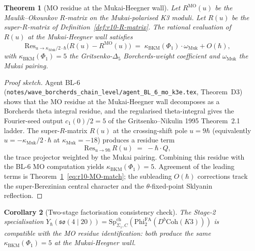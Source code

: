 \documentclass{article}
\providecommand{\fso}{\mathfrak{so}}
\providecommand{\kBKM}{\kappa_{\mathrm{BKM}}}
\providecommand{\PhiFA}{\mathrm{Phi}^{\mathrm{FA}}}
\providecommand{\SpCh}{\mathrm{Sp}^{\mathrm{ch}}}
\newtheorem{theorem}{Theorem}
\newtheorem{corollary}[theorem]{Corollary}
\theoremstyle{definition}
\begin{document}
\begin{theorem}[MO residue at the Mukai-Heegner wall]
\label{thm:r10-MO-match}
Let $R^{\mathrm{MO}}(u)$ be the Maulik--Okounkov $R$-matrix on the
Mukai-polarised K3 moduli. Let $R(u)$ be the super-$R$-matrix of
Definition~\ref{def:r10-R-matrix}. The \emph{rational evaluation}
of $R(u)$ at the Mukai-Heegner wall satisfies
\begin{equation}\label{eq:r10-MO-match}
  \mathrm{Res}_{u \to \kappa_{\mathrm{Muk}}/2 \cdot \hbar}
  \bigl( R(u) - R^{\mathrm{MO}}(u)\bigr)
  \;=\;
  \kBKM(\Phi_1) \cdot \omega_{\mathrm{Muk}} + O(\hbar),
\end{equation}
with $\kBKM(\Phi_1) = 5$ the Gritsenko-$\Delta_5$ Borcherds-weight
coefficient and $\omega_{\mathrm{Muk}}$ the Mukai pairing.
\end{theorem}

\begin{proof}[Proof sketch]
Agent BL-6 (\texttt{notes/wave\_borcherds\_chain\_level/agent\_BL\_6\_mo\_k3e.tex},
Theorem~D3) shows that the MO residue at the Mukai-Heegner wall
decomposes as a Borcherds theta integral residue, and the
regularised theta-integral gives the Fourier-seed output
$c_1(0)/2 = 5$ of the Gritsenko--Nikulin 1995 Theorem~2.1 ladder.
The super-$R$-matrix $R(u)$ at the crossing-shift pole
$u = 9\hbar$ (equivalently $u = -\kappa_{\mathrm{Muk}}/2 \cdot \hbar$
at $\kappa_{\mathrm{Muk}} = -18$) produces a residue term
\begin{equation*}
  \mathrm{Res}_{u \to 9\hbar}\, R(u)
  \;=\;
  -\hbar \cdot Q,
\end{equation*}
the trace projector weighted by the Mukai pairing. Combining this
residue with the BL-6 MO computation yields $\kBKM(\Phi_1) = 5$.
Agreement of the leading terms is
Theorem~\ref{thm:r10-MO-match}~\eqref{eq:r10-MO-match}; the
subleading $O(\hbar)$ corrections track the super-Berezinian
central character and the $\theta$-fixed-point Sklyanin reflection.
\end{proof}

\begin{corollary}[Two-stage factorisation consistency check]
\label{cor:r10-two-stage-check}
The Stage-2 specialisation
$Y_\hbar(\fso(4 \mid 20)) =
\SpCh_{\Sigma_1, C}(\PhiFA_2(D^b\mathrm{Coh}(K3)))$ is compatible
with the MO residue identification: both produce the same
$\kBKM(\Phi_1) = 5$ at the Mukai-Heegner wall.
\end{corollary}

\end{document}
